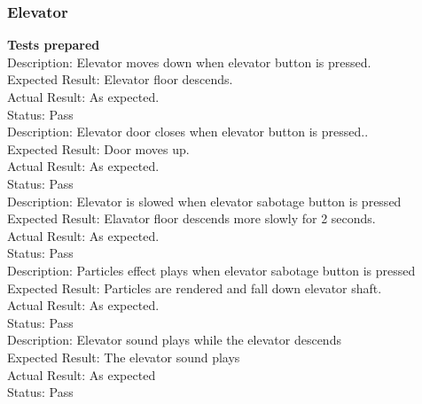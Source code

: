 \documentclass[11pt,a4paper]{article}
\begin{document}
\subsubsection{Elevator}
\textbf{Tests prepared}\\
Description: Elevator moves down when elevator button is pressed.\\
Expected Result: Elevator floor descends.\\
Actual Result: As expected.\\
Status: Pass
\smallskip\\
Description: Elevator door closes when elevator button is pressed..\\
Expected Result: Door moves up.\\
Actual Result: As expected.\\
Status: Pass
\smallskip\\
Description: Elevator is slowed when elevator sabotage button is pressed\\
Expected Result: Elavator floor descends more slowly for 2 seconds.\\
Actual Result: As expected.\\
Status: Pass
\smallskip\\
Description: Particles effect plays when elevator sabotage button is pressed\\
Expected Result: Particles are rendered and fall down elevator shaft.\\
Actual Result: As expected.\\
Status: Pass
\smallskip\\
Description: Elevator sound plays while the elevator descends\\
Expected Result: The elevator sound plays\\
Actual Result:  As expected\\
Status: Pass
\end{document}
